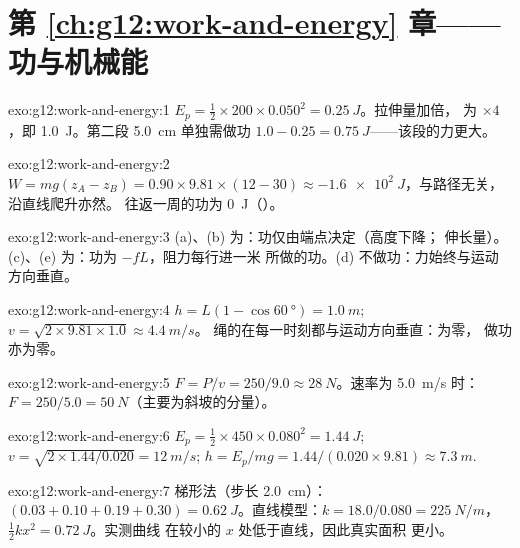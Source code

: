\section*{第 \ref{ch:g12:work-and-energy} 章——功与机械能}

\begin{solution}{exo:g12:work-and-energy:1}
$E_p = \tfrac12 \times 200 \times 0.050^2 = \qty{0.25}{J}$。拉伸量加倍，
为 $\times 4$，即 \qty{1.0}{J}。第二段 \qty{5.0}{cm}
单独需做功 $1.0 - 0.25 = \qty{0.75}{J}$——该段的力更大。
\end{solution}

\begin{solution}{exo:g12:work-and-energy:2}
$W = mg(z_A - z_B) = 0.90 \times 9.81 \times (12 - 30) \approx
\qty{-1.6e2}{J}$，与路径无关，沿直线爬升亦然。
往返一周的功为 \qty{0}{J}（）。
\end{solution}

\begin{solution}{exo:g12:work-and-energy:3}
(a)、(b) 为：功仅由端点决定（高度下降；
伸长量）。(c)、(e) 为：功为 $-fL$，阻力每行进一米
所做的功。(d) 不做功：力始终与运动方向垂直。
\end{solution}

\begin{solution}{exo:g12:work-and-energy:4}
$h = L(1 - \cos\qty{60}{\degree}) = \qty{1.0}{m}$;
$v = \sqrt{2 \times 9.81 \times 1.0} \approx \qty{4.4}{m/s}$。
绳的在每一时刻都与运动方向垂直：为零，
做功亦为零。
\end{solution}

\begin{solution}{exo:g12:work-and-energy:5}
$F = P/v = 250/9.0 \approx \qty{28}{N}$。速率为 \qty{5.0}{m/s} 时：
$F = 250/5.0 = \qty{50}{N}$（主要为斜坡的分量）。
\end{solution}

\begin{solution}{exo:g12:work-and-energy:6}
$E_p = \tfrac12 \times 450 \times 0.080^2 = \qty{1.44}{J}$;
$v = \sqrt{2 \times 1.44/0.020} = \qty{12}{m/s}$;
$h = E_p/mg = 1.44/(0.020 \times 9.81) \approx \qty{7.3}{m}$.
\end{solution}

\begin{solution}{exo:g12:work-and-energy:7}
梯形法（步长 \qty{2.0}{cm}）：$(0.03 + 0.10 + 0.19 + 0.30) =
\qty{0.62}{J}$。直线模型：$k = 18.0/0.080 =
\qty{225}{N/m}$，$\tfrac12 kx^2 = \qty{0.72}{J}$。实测曲线
在较小的 $x$ 处低于直线，因此真实面积
更小。
\end{solution}

